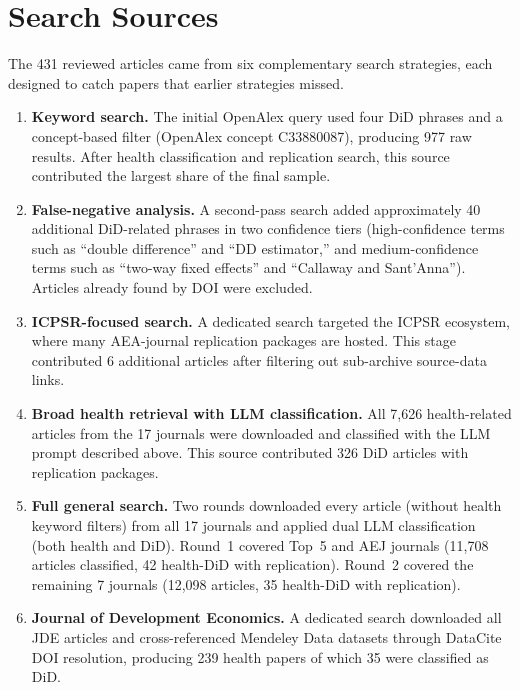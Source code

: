 \section{Search Sources}

The 431 reviewed articles came from six complementary search strategies, each designed to catch papers that earlier strategies missed.

\begin{enumerate}
  \item \textbf{Keyword search.} The initial OpenAlex query used four DiD phrases and a concept-based filter (OpenAlex concept C33880087), producing 977 raw results. After health classification and replication search, this source contributed the largest share of the final sample.

  \item \textbf{False-negative analysis.} A second-pass search added approximately 40 additional DiD-related phrases in two confidence tiers (high-confidence terms such as ``double difference'' and ``DD estimator,'' and medium-confidence terms such as ``two-way fixed effects'' and ``Callaway and Sant'Anna''). Articles already found by DOI were excluded.

  \item \textbf{ICPSR-focused search.} A dedicated search targeted the ICPSR ecosystem, where many AEA-journal replication packages are hosted. This stage contributed 6 additional articles after filtering out sub-archive source-data links.

  \item \textbf{Broad health retrieval with LLM classification.} All 7,626 health-related articles from the 17 journals were downloaded and classified with the LLM prompt described above. This source contributed 326 DiD articles with replication packages.

  \item \textbf{Full general search.} Two rounds downloaded every article (without health keyword filters) from all 17 journals and applied dual LLM classification (both health and DiD). Round~1 covered Top~5 and AEJ journals (11,708 articles classified, 42 health-DiD with replication). Round~2 covered the remaining 7 journals (12,098 articles, 35 health-DiD with replication).

  \item \textbf{Journal of Development Economics.} A dedicated search downloaded all JDE articles and cross-referenced Mendeley Data datasets through DataCite DOI resolution, producing 239 health papers of which 35 were classified as DiD.
\end{enumerate}

